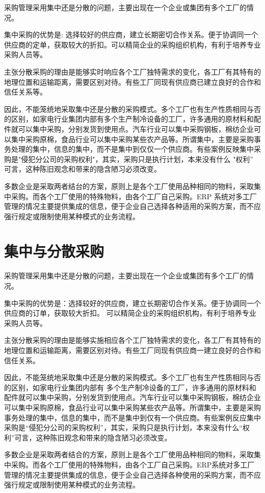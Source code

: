     采购管理采用集中还是分散的问题，主要出现在一个企业或集团有多个工厂的情况。

    集中采购的优势是: 选择较好的供应商，建立长期密切合作关系。便于协调同一个供应商的定单，获取较大的折扣。可以精简企业的采购组织机构，有利于培养专业采购人员等。

    主张分散采购的理由是能够实时响应各个工厂独特需求的变化，各工厂有其特有的地理位置和运输距离，需要区别对待。有些工厂同现有供应商已建立良好的合作和信任关系等。

    因此，不能笼统地采取集中还是分散的采购模式。多个工厂也有生产性质相同与否的区别，如家电行业集团内部有多个生产制冷设备的工厂，许多通用的原材料和配件就可以集中采购，分别发货到使用点。汽车行业可以集中采购钢板，棉纺企业可以集中采购原棉，食品行业可以集中采购某些农产品等。所谓集中，主要是采购事务处理的集中，信息的集中，而不是集中到仅仅一个供应商。有些案例反映集中采购是"侵犯分公司的采购权利"，其实，采购只是执行计划，本来没有什么 "权利” 可言，这种陈旧观念和带来的隐含陋习必须改变。

    多数企业是采取两者结台的方案，原则上是各个工厂使用品种相同的物料，采取集中采购。而各个工厂使用的特殊物料，由各个工厂自己采购。ERP 系统对多工厂管理的情况主要提供集成的信息，便于企业自己选择各种适用的采购方案，而不应强行规定或限制使用某种模式的业务流程。

\section {集中与分散采购}

    采购管理采用集中还是分散的问题，主要出现在一个企业或集团有多个工厂的情况。

    集中采购的优势是：选择较好的供应商，建立长期密切合作关系。便于协调同一个供应商的订单，获取较大折扣。
    可以精简企业的采购组织机构，有利于培养专业采购人员等。

    主张分散采购的理由是能够实施相应各个工厂独特需求的变化，各工厂有其特有的地理位置和运输距离，需要区别对待。有些工厂同现有供应商一建立良好的合作和信任关系。

    因此，不能笼统地采取集中还是分散的采购模式。多个工厂也有生产性质相同与否的区别，如家电行业集团内部有
    多个生产制冷设备的工厂，许多通用的原材料和配件就可以集中采购，分别发货到使用点。汽车行业可以集中采购钢板，棉纺企业可以集中采购原棉，食品行业可以集中采购某些农产品等。所谓集中，主要是采购事务处理的集中，信息的集中，而不是集中到仅有一个供应商。有些案例反应集中采购是“侵犯分公司的采购权利”，其实，采购只是执行计划，本来没有什么“权利”可言，这种陈旧观念和带来的隐含陋习必须改变。

    多数企业是采取两者结合的方案，原则上是各个工厂使用品种相同的物料，采取集中采购。而各个工厂使用的特殊物料，由各个工厂自己采购。ERP系统对多工厂管理的情况主要提供集成的信息，便于企业自己选择各种使用的采购方案，而不应强行规定或限制使用某种模式的业务流程。
